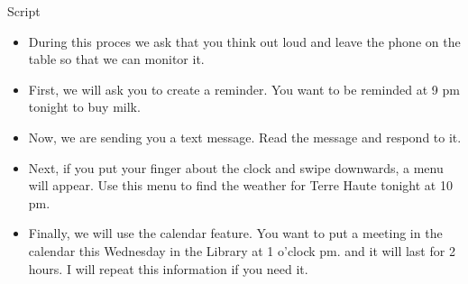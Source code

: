 \documentclass{article}
\begin{document}
Script
\rhead{}

\begin{itemize}
    \item During this proces we ask that you think out loud and leave the phone on the table so that we can monitor it.
    \item First, we will ask you to create a reminder. You want to be reminded at 9 pm  tonight to buy milk. 
    \item Now, we are sending you a text message.  Read the message and respond to it.
    \item Next, if you put your finger about the clock and swipe downwards, a menu will appear. Use this menu to find the weather for Terre Haute tonight at 10 pm. 
    \item Finally, we will use the calendar feature.  You want to put a meeting in the calendar this Wednesday in the Library at 1 o'clock pm. and it will last for 2 hours. I will repeat this information if you need it.
\end{itemize}
\end{document}
